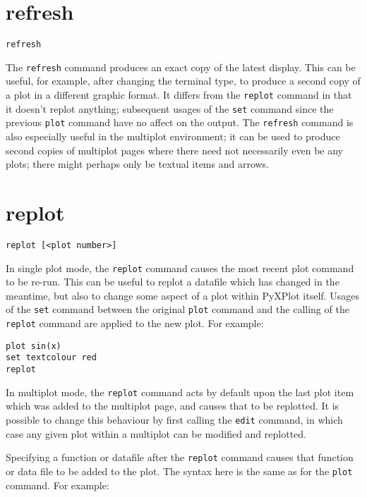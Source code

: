 \section{refresh}

\begin{verbatim}
refresh
\end{verbatim}

The {\tt refresh} command produces an exact copy of the latest display. This can
be useful, for example, after changing the terminal type, to produce a second
copy of a plot in a different graphic format. It differs from the {\tt replot}
command in that it doesn't replot anything; subsequent usages of the {\tt set}
command since the previous {\tt plot} command have no affect on the output. The
{\tt refresh} command is also especially useful in the multiplot environment; it
can be used to produce second copies of multiplot pages where there need not
necessarily even be any plots; there might perhaps only be textual items and
arrows.


\section{replot}

\begin{verbatim}
replot [<plot number>]
\end{verbatim}

In single plot mode, the {\tt replot} command causes the most recent plot
command to be re-run.  This can be useful to replot a datafile which has changed
in the meantime, but also to change some aspect of a plot within PyXPlot itself.
Usages of the {\tt set} command between the original {\tt plot} command and the
calling of the {\tt replot} command are applied to the new plot. For example:

\begin{verbatim}
plot sin(x)
set textcolour red
replot
\end{verbatim}

In multiplot mode, the {\tt replot} command acts by default upon the last plot
item which was added to the multiplot page, and causes that to be replotted. It
is possible to change this behaviour by first calling the {\tt edit} command, in
which case any given plot within a multiplot can be modified and replotted.

Specifying a function or datafile after the {\tt replot} command causes that
function or data file to be added to the plot. The syntax here is the same as
for the {\tt plot} command.  For example:


